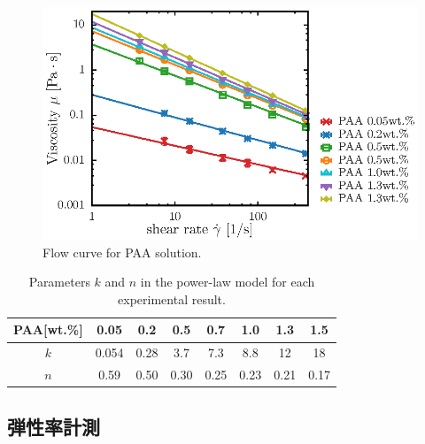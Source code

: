 \begin{figure}[ht]
	\centering
	\includegraphics[width=13cm,clip]{4-Results/viscosity.eps}
	\caption{Flow curve for PAA solution.}
	\label{fig:PAA-vis}
\end{figure}

\begin{table}[h]
	\centering
	\caption{Parameters $k$ and $n$ in the power-law model for each experimental result.}
	\label{table:power-law}
	\begin{tabular}{c|c|c|c|c|c|c|c} \hline
		PAA[wt.\%] & 0.05  & 0.2  & 0.5  & 0.7  & 1.0  & 1.3  & 1.5  \\ \hline \hline
		$k$        & 0.054 & 0.28 & 3.7  & 7.3  & 8.8  & 12   & 18   \\
		$n$        & 0.59  & 0.50 & 0.30 & 0.25 & 0.23 & 0.21 & 0.17 \\ \hline
	\end{tabular}
\end{table}

\newpage

\subsection{弾性率計測}

